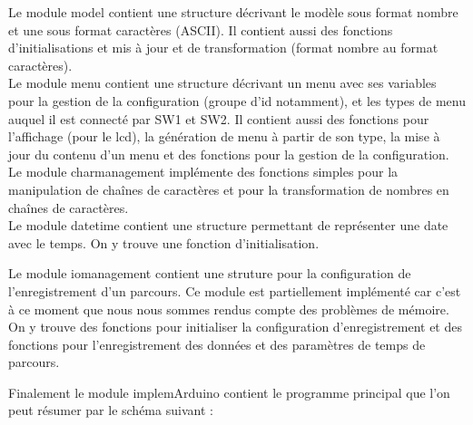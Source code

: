 \documentclass{report}
\begin{document}
Le module model contient une structure décrivant le modèle
sous format nombre et une sous format caractères (ASCII). Il contient
aussi des fonctions d'initialisations et mis à jour et de
transformation (format nombre au format caractères). \\
Le module menu contient une structure décrivant un menu avec ses
variables pour la gestion de la configuration (groupe d'id notamment),
et les types de menu auquel il est connecté par SW1 et SW2. Il contient
aussi des fonctions pour l'affichage (pour le lcd), la génération de menu
à partir de son type, la mise à jour du contenu d'un menu et des 
fonctions pour la gestion de la configuration. \\
Le module charmanagement implémente des fonctions simples pour la
manipulation de chaînes de caractères et pour la transformation de
nombres en chaînes de caractères. \\
Le module datetime contient une structure permettant de représenter 
une date avec le temps. On y trouve une fonction d'initialisation.

Le module iomanagement contient une struture pour la configuration
de l'enregistrement d'un parcours. Ce module est partiellement
implémenté car c'est à ce moment que nous nous sommes rendus
compte des problèmes de mémoire. On y trouve des fonctions pour
initialiser la configuration d'enregistrement et des fonctions
pour l'enregistrement des données et des paramètres de temps de parcours.

Finalement le module implemArduino contient le programme principal
que l'on peut résumer par le schéma suivant :
\end{document}
